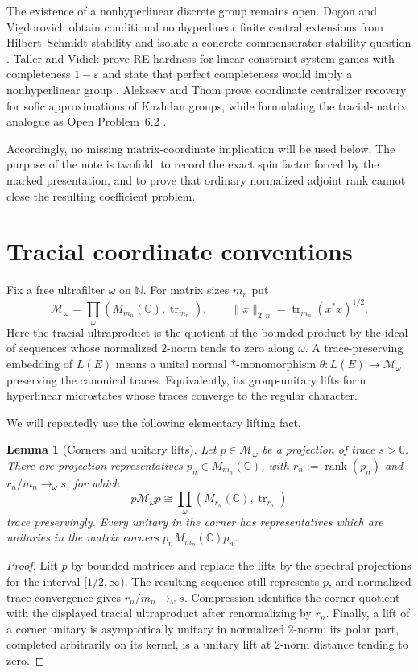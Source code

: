 \documentclass[11pt]{article}
\newtheorem{lemma}[theorem]{Lemma}
\theoremstyle{definition}
\theoremstyle{remark}
\newcommand{\C}{\mathbb C}
\newcommand{\tr}{\operatorname{tr}}
\newcommand{\rank}{\operatorname{rank}}
\begin{document}
The existence of a nonhyperlinear discrete group remains open.  Dogon and
Vigdorovich obtain conditional nonhyperlinear finite central extensions from
Hilbert--Schmidt stability and isolate a concrete commensurator-stability
question \cite{DogonVigdorovich}.  Taller and Vidick prove RE-hardness for
linear-constraint-system games with completeness $1-\varepsilon$ and state
that perfect completeness would imply a nonhyperlinear group
\cite{TallerVidick}.  Alekseev and Thom prove coordinate centralizer
recovery for sofic approximations of Kazhdan groups, while formulating the
tracial-matrix analogue as Open Problem~6.2 \cite{AlekseevThom}.

Accordingly, no missing matrix-coordinate implication will be used below.
The purpose of the note is twofold: to record the exact spin factor forced by
the marked presentation, and to prove that ordinary normalized adjoint rank
cannot close the resulting coefficient problem.

\section{Tracial coordinate conventions}

Fix a free ultrafilter $\omega$ on $\mathbb N$.  For matrix sizes $m_n$ put
\[
 \mathcal M_\omega
 =\prod_\omega(M_{m_n}(\C),\tr_{m_n}),
 \qquad
 \|x\|_{2,n}=\tr_{m_n}(x^*x)^{1/2}.
\]
Here the tracial ultraproduct is the quotient of the bounded product by the
ideal of sequences whose normalized $2$-norm tends to zero along $\omega$.
A trace-preserving embedding of $L(E)$ means a unital normal
$*$-monomorphism $\theta:L(E)\to\mathcal M_\omega$ preserving the canonical
traces.  Equivalently, its group-unitary lifts form hyperlinear microstates
whose traces converge to the regular character.

We will repeatedly use the following elementary lifting fact.

\begin{lemma}[Corners and unitary lifts]\label{lem:cornerlifts}
Let $p\in\mathcal M_\omega$ be a projection of trace $s>0$.  There are
projection representatives $p_n\in M_{m_n}(\C)$, with
$r_n:=\rank(p_n)$ and $r_n/m_n\to_\omega s$, for which
\[
 p\mathcal M_\omega p
 \cong \prod_\omega(M_{r_n}(\C),\tr_{r_n})
\]
trace preservingly.  Every unitary in the corner has representatives which
are unitaries in the matrix corners $p_nM_{m_n}(\C)p_n$.
\end{lemma}

\begin{proof}
Lift $p$ by bounded matrices and replace the lifts by the spectral
projections for the interval $[1/2,\infty)$.  The resulting sequence still
represents $p$, and normalized trace convergence gives
$r_n/m_n\to_\omega s$.  Compression identifies the corner quotient with the
displayed tracial ultraproduct after renormalizing by $r_n$.  Finally, a
lift of a corner unitary is asymptotically unitary in normalized $2$-norm;
its polar part, completed arbitrarily on its kernel, is a unitary lift at
$2$-norm distance tending to zero.
\end{proof}
\end{document}
